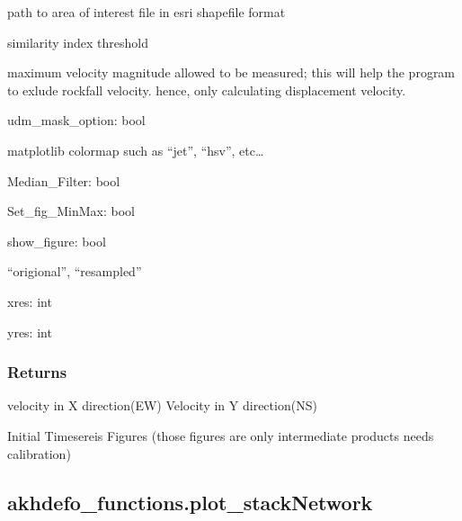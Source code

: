 \documentclass[letterpaper,10pt]{sphinxmanual}
\begin{document}
\begin{fulllineitems}
\begin{description}
\sphinxAtStartPar
path to area of interest file in esri shapefile format

\sphinxAtStartPar
similarity index threshold

\sphinxAtStartPar
maximum velocity magnitude allowed to be measured; this will help the program to exlude rockfall velocity.
hence, only calculating displacement velocity.

\end{description}

\sphinxAtStartPar
udm\_mask\_option: bool
\begin{description}
\sphinxAtStartPar
matplotlib colormap such as “jet”, “hsv”, etc…

\end{description}

\sphinxAtStartPar
Median\_Filter: bool

\sphinxAtStartPar
Set\_fig\_MinMax: bool

\sphinxAtStartPar
show\_figure: bool
\begin{description}
\sphinxAtStartPar
“origional”,  “resampled”

\end{description}

\sphinxAtStartPar
xres: int

\sphinxAtStartPar
yres: int


\subsubsection{Returns}
\label{\detokenize{generated/akhdefo_functions.DynamicChangeDetection:returns}}\begin{description}
\sphinxAtStartPar
velocity in X direction(EW)
Velocity in Y direction(NS)

\sphinxAtStartPar
Initial Timesereis Figures (those figures are only intermediate products needs calibration)

\end{description}

\end{fulllineitems}


\sphinxstepscope


\subsection{akhdefo\_functions.plot\_stackNetwork}
\label{\detokenize{generated/akhdefo_functions.plot_stackNetwork:akhdefo-functions-plot-stacknetwork}}\label{\detokenize{generated/akhdefo_functions.plot_stackNetwork::doc}}
\end{document}
